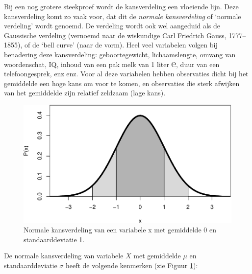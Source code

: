 \documentclass[
]{book}
\begin{document}
Bij een nog grotere steekproef wordt de kansverdeling een vloeiende lijn.
Deze kansverdeling komt zo vaak voor, dat dit de \emph{normale kansverdeling}
of `normale verdeling' wordt genoemd. De verdeling wordt ook wel
aangeduid als de Gaussische verdeling (vernoemd naar de wiskundige Carl
Friedrich Gauss, 1777--1855), of de `bell curve' (naar de vorm). Heel
veel variabelen volgen bij benadering deze kansverdeling:
geboortegewicht, lichaamslengte, omvang van woordenschat, IQ, inhoud van
een pak melk van 1 liter ℮, duur van een telefoongesprek, enz enz. Voor
al deze variabelen hebben observaties dicht bij het gemiddelde een hoge
kans om voor te komen, en observaties die sterk afwijken van het
gemiddelde zijn relatief zeldzaam (lage kans).

\begin{figure}
\centering
\includegraphics{KMS-NL_files/figure-latex/normaalkansverdeling-1.pdf}
\caption{\label{fig:normaalkansverdeling}Normale kansverdeling van een variabele x met gemiddelde 0 en standaarddeviatie 1.}
\end{figure}

De normale kansverdeling van variabele \(X\) met gemiddelde \(\mu\) en
standaarddeviatie \(\sigma\) heeft de volgende kenmerken (zie
Figuur \ref{fig:normaalkansverdeling}):
\end{document}
